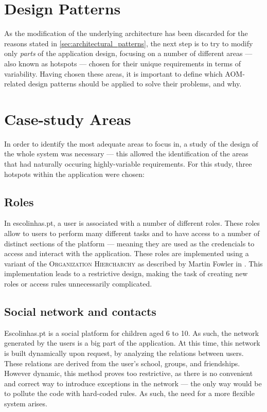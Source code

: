 \section{Design Patterns}\label{sec:design_patterns}

As the modification of the underlying architecture has been discarded for the reasons stated in \ref{sec:architectural_patterns}, the next step is to try to modify only \emph{parts} of the application design, focusing on a number of different areas --- also known as hotspots --- chosen for their unique requirements in terms of variability. Having chosen these areas, it is important to define which AOM-related design patterns should be applied to solve their problems, and why.

\section{Case-study Areas}\label{sec:case-study_areas}

In order to identify the most adequate areas to focus in, a study of the design of the whole system was necessary --- this allowed the identification of the areas that had naturally occuring highly-variable requirements. For this study, three hotspots within the application were chosen:

\subsection{Roles}\label{sec:case-study_areas_roles}

In escolinhas.pt, a user is associated with a number of different roles. These roles allow to users to perform many different tasks and to have access to a number of distinct sections of the platform --- meaning they are used as the credencials to access and interact with the application. These roles are implemented using a variant of the \textsc{Organization Hiercharchy} as described by Martin Fowler in \cite{fowler_accountability}. This implementation leads to a restrictive design, making the task of creating new roles or access rules unnecessarily complicated.
  
\subsection{Social network and contacts}\label{sec:case-study_areas_social_network}
Escolinhas.pt is a social platform for children aged 6 to 10. As such, the network generated by the users is a big part of the application. At this time, this network is built dynamically upon request, by analyzing the relations between users. These relations are derived from the user's school, groups, and friendships. However dynamic, this method proves too restrictive, as there is no convenient and correct way to introduce exceptions in the network --- the only way would be to pollute the code with hard-coded rules. As such, the need for a more flexible system arises.

